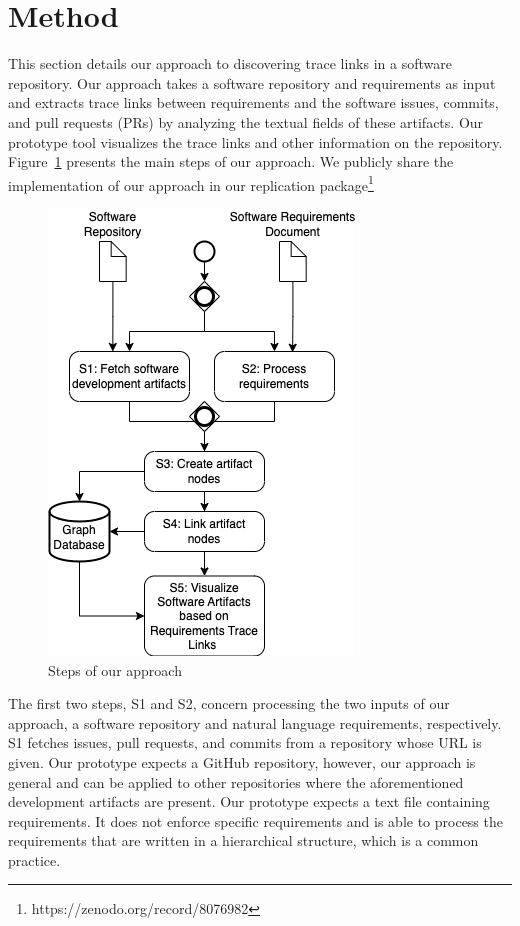 \section{Method}
\label{sec:approach}

This section details our approach to discovering trace links in a software repository. Our approach takes a software repository and requirements as input and extracts trace links between requirements and the software issues, commits, and pull requests (PRs) by analyzing the textual fields of these artifacts. Our prototype tool visualizes the trace links and other information on the repository. Figure~\ref{fig:sys-flow} presents the main steps of our approach. We publicly share the implementation of our approach in our replication package\footnote{https://zenodo.org/record/8076982}

\begin{figure}[htb]
    \centering
    \includegraphics[width=0.65\linewidth]{figs/approach.png}
    \caption{Steps of our approach}
    \label{fig:sys-flow}
  \end{figure}

  The first two steps, \textsf{S1} and \textsf{S2}, concern processing the two inputs of our approach, a software repository and natural language requirements, respectively. \textsf{S1} fetches issues, pull requests, and commits from a repository whose URL is given. Our prototype expects a GitHub repository, however, our approach is general and can be applied to other repositories where the aforementioned development artifacts are present. %
  Our prototype expects a text file containing requirements. It does not enforce specific requirements and is able to process the requirements that are written in a hierarchical structure, which is a common practice.

